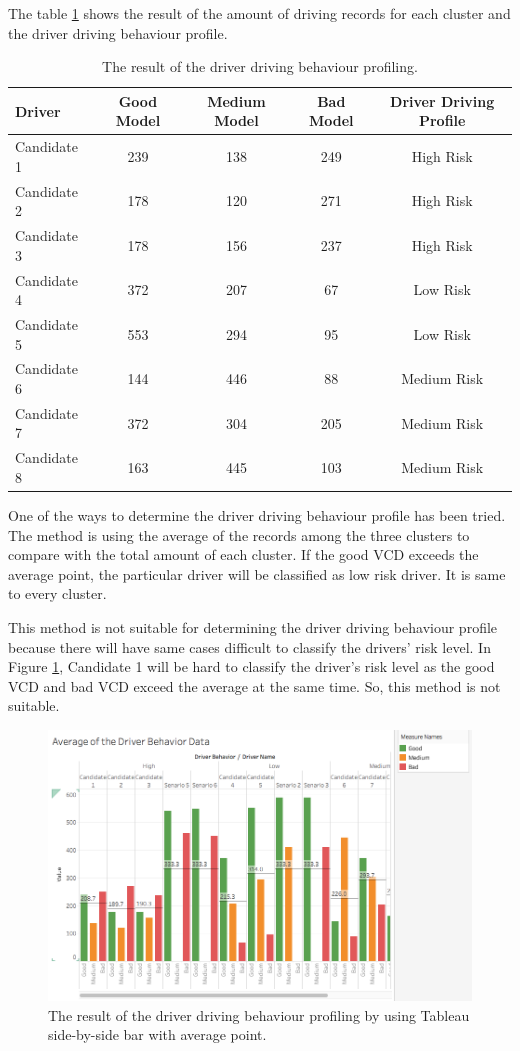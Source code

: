 The table \ref{tbl:result} shows the result of the amount of driving records for each cluster and the driver driving behaviour profile.

\begin{table}[h!]
\begin{tabular}{|l|c|c|c|c|}
\hline
Driver & Good Model & Medium Model & Bad Model & Driver Driving Profile \\

\hline
Candidate 1 & 239 & 138 & 249 & High Risk\\

\hline
Candidate 2 & 178 & 120 & 271 & High Risk\\
  
\hline
Candidate 3 & 178 & 156 & 237 & High Risk\\

\hline
Candidate 4 & 372 & 207 & 67 & Low Risk\\

\hline
Candidate 5 & 553 & 294 & 95 & Low Risk\\

\hline
Candidate 6 & 144 & 446 & 88 & Medium Risk\\

\hline
Candidate 7 & 372 & 304 & 205 & Medium Risk\\

\hline
Candidate 8 & 163 & 445 & 103 & Medium Risk\\

\hline
\end{tabular}
\label{tbl:result}
\caption{The result of the driver driving behaviour profiling.}    
\end{table}

One of the ways to determine the driver driving behaviour profile has been tried. The method is using the average of the records among the three clusters to compare with the total amount of each cluster. If the good VCD exceeds the average point, the particular driver will be classified as low risk driver. It is same to every cluster.

This method is not suitable for determining the driver driving behaviour profile because there will have same cases difficult to classify the drivers' risk level. In Figure \ref{fig:Tresult}, Candidate 1 will be hard to classify the driver's risk level as the good VCD and bad VCD exceed the average at the same time. So, this method is not suitable.
 
\begin{figure}[hbt!]\centering
\includegraphics[width=.75\textwidth]{image/Tresult}
\caption{The result of the driver driving behaviour profiling by using Tableau side-by-side bar with average point.}
\label{fig:Tresult}
\end{figure} 